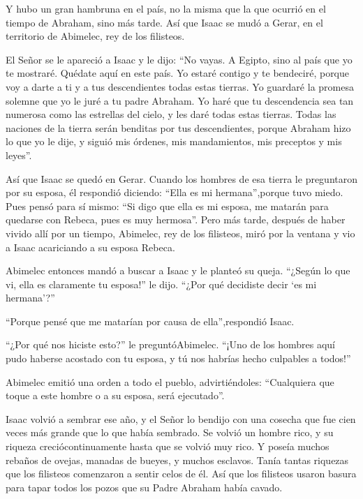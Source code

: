  Y hubo un gran hambruna en el país, no la misma que la que
ocurrió en el tiempo de Abraham, sino más tarde. Así que Isaac se mudó a
Gerar, en el territorio de Abimelec, rey de los filisteos.

 El Señor se le apareció a Isaac y le dijo: ``No vayas. A
Egipto, sino al país que yo te mostraré.  Quédate aquí en
este país. Yo estaré contigo y te bendeciré, porque voy a darte a ti y a
tus descendientes todas estas tierras. Yo guardaré la promesa solemne
que yo le juré a tu padre Abraham.  Yo haré que tu
descendencia sea tan numerosa como las estrellas del cielo, y les daré
todas estas tierras. Todas las naciones de la tierra serán benditas por
tus descendientes,  porque Abraham hizo lo que yo le dije, y
siguió mis órdenes, mis mandamientos, mis preceptos y mis leyes''.

 Así que Isaac se quedó en Gerar.  Cuando los
hombres de esa tierra le preguntaron por su esposa, él respondió
diciendo: ``Ella es mi hermana'',porque tuvo miedo. Pues pensó para sí
mismo: ``Si digo que ella es mi esposa, me matarán para quedarse con
Rebeca, pues es muy hermosa''.  Pero más tarde, después de
haber vivido allí por un tiempo, Abimelec, rey de los filisteos, miró
por la ventana y vio a Isaac acariciando a su esposa Rebeca.

 Abimelec entonces mandó a buscar a Isaac y le planteó su
queja. ``¿Según lo que vi, ella es claramente tu esposa!'' le dijo.
``¿Por qué decidiste decir `es mi hermana'?''

``Porque pensé que me matarían por causa de ella'',respondió Isaac.

 ``¿Por qué nos hiciste esto?'' le preguntóAbimelec. ``¡Uno
de los hombres aquí pudo haberse acostado con tu esposa, y tú nos
habrías hecho culpables a todos!''

 Abimelec emitió una orden a todo el pueblo,
advirtiéndoles: ``Cualquiera que toque a este hombre o a su esposa, será
ejecutado''.

 Isaac volvió a sembrar ese año, y el Señor lo bendijo con
una cosecha que fue cien veces más grande que lo que había sembrado.
 Se volvió un hombre rico, y su riqueza creciócontinuamente
hasta que se volvió muy rico.  Y poseía muchos rebaños de
ovejas, manadas de bueyes, y muchos esclavos. Tanía tantas riquezas que
los filisteos comenzaron a sentir celos de él.  Así que los
filisteos usaron basura para tapar todos los pozos que su Padre Abraham
había cavado.

